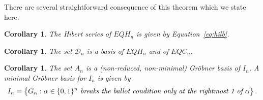 \documentclass[submission]{FPSAC2023}
\newtheorem{cor}[theorem]{Corollary}
\theoremstyle{definition}
\numberwithin{equation}{section}
\begin{document}
There are several straightforward consequence of this theorem which we state here.

\begin{cor}\label{cor:hilb}  The Hibert series of $EQH_{n}$ is given by Equation~\eqref{eq:hilb}.
\end{cor}

\begin{cor} The set ${\mathcal D}_n$ is a basis of $EQH_n$ and of $EQC_n$.
\end{cor}

\begin{cor}\label{cor:minimalGB}
The set $A_n$ is a (non-reduced, non-minimal) Gr\"obner basis of $I_n$. A minimal Gr\"obner basis for $I_n$ is given by
$$ I_n =\big\{ G_\alpha : \alpha \in \{0,1\}^n \text{ \it breaks the ballot condition only
at the rightmost  1 of }  \alpha\big\}\,.
$$
\end{cor}
\end{document}
